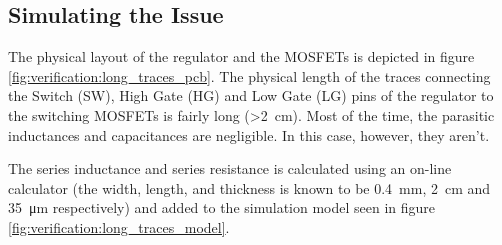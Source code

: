 \subsection{Simulating the Issue}

The physical layout of  the  regulator  and  the  MOSFETs  is depicted in figure
\ref{fig:verification:long_traces_pcb}.  The  physical   length  of  the  traces
connecting the  Switch  (SW),  High  Gate  (HG)  and  Low  Gate (LG) pins of the
regulator to the switching MOSFETs is fairly  long (>\SI{2}{\centi\metre}). Most
of the time, the parasitic  inductances and capacitances are negligible. In this
case, however, they aren't.

The series  inductance  and  series  resistance  is  calculated using an on-line
calculator\cite{ref:trace_inductance}\cite{ref:trace_resistance}   (the   width,
length,    and    thickness    is    known   to    be    \SI{0.4}{\milli\metre},
\SI{2}{\centi\metre}  and \SI{35}{\micro\metre} respectively) and added  to  the
simulation   model  seen  in  figure   \ref{fig:verification:long_traces_model}.

